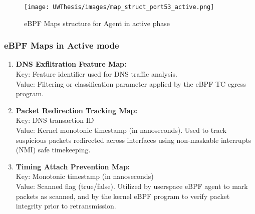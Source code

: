 \documentclass [11pt, proquest] {uwthesis}[2020/02/24]
\begin{document}
\begin{figure}[htbp]
\centering
\texttt{[image: UWThesis/images/map\_struct\_port53\_active.png]}
\caption{eBPF Maps structure for Agent in active phase}
\label{sec:dp_eBPF_LRU_Maps_active}
\end{figure}

\subsubsection{\textbf{eBPF Maps in Active mode}}
\begin{enumerate}[itemsep=1pt,parsep=0pt]
\label{sec:maps}
\item \textbf{DNS Exfiltration Feature Map:} \\
Key: Feature identifier used for DNS traffic analysis. \\
Value: Filtering or classification parameter applied by the eBPF TC egress program.

\item \textbf{Packet Redirection Tracking Map:} \\
Key: DNS transaction ID \\
Value: Kernel monotonic timestamp (in nanoseconds). Used to track suspicious packets redirected across interfaces using non-maskable interrupts (NMI) safe timekeeping.

\item \textbf{Timing Attach Prevention Map:} \\
Key: Monotonic timestamp (in nanoseconds) \\
Value: Scanned flag (true/false). Utilized by userspace eBPF agent to mark packets as scanned, and by the kernel eBPF program to verify packet integrity prior to retransmission.
\end{enumerate}
\end{document}
